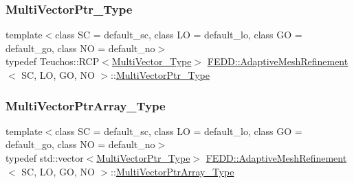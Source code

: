 \subsubsection{\texorpdfstring{Multi\+Vector\+Ptr\+\_\+\+Type}{MultiVectorPtr\_Type}}
{\footnotesize\ttfamily template$<$class SC = default\+\_\+sc, class LO = default\+\_\+lo, class GO = default\+\_\+go, class NO = default\+\_\+no$>$ \\
typedef Teuchos\+::\+R\+CP$<$\hyperlink{classFEDD_1_1AdaptiveMeshRefinement_afba165f2caa97c6de40654b1ee51e38d}{Multi\+Vector\+\_\+\+Type}$>$ \hyperlink{classFEDD_1_1AdaptiveMeshRefinement}{F\+E\+D\+D\+::\+Adaptive\+Mesh\+Refinement}$<$ SC, LO, GO, NO $>$\+::\hyperlink{classFEDD_1_1AdaptiveMeshRefinement_af4fb11adbdf1bba9bcaf8952324d32f2}{Multi\+Vector\+Ptr\+\_\+\+Type}}

\mbox{\label{classFEDD_1_1AdaptiveMeshRefinement_ab682c21b2aedae4d190d83018fa93df0}} 
\subsubsection{\texorpdfstring{Multi\+Vector\+Ptr\+Array\+\_\+\+Type}{MultiVectorPtrArray\_Type}}
{\footnotesize\ttfamily template$<$class SC = default\+\_\+sc, class LO = default\+\_\+lo, class GO = default\+\_\+go, class NO = default\+\_\+no$>$ \\
typedef std\+::vector$<$\hyperlink{classFEDD_1_1AdaptiveMeshRefinement_af4fb11adbdf1bba9bcaf8952324d32f2}{Multi\+Vector\+Ptr\+\_\+\+Type}$>$ \hyperlink{classFEDD_1_1AdaptiveMeshRefinement}{F\+E\+D\+D\+::\+Adaptive\+Mesh\+Refinement}$<$ SC, LO, GO, NO $>$\+::\hyperlink{classFEDD_1_1AdaptiveMeshRefinement_ab682c21b2aedae4d190d83018fa93df0}{Multi\+Vector\+Ptr\+Array\+\_\+\+Type}}

\mbox{\label{classFEDD_1_1AdaptiveMeshRefinement_a5926fc86d008bfd69ae52e9190197eb0}} 
